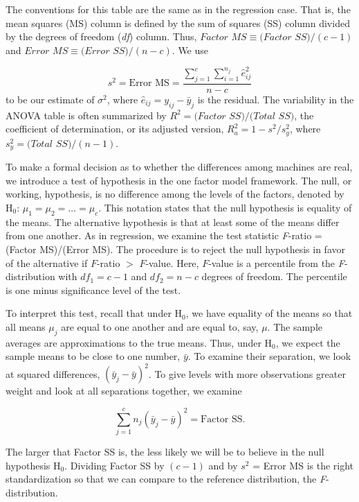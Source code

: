 The conventions for this table are the same as in the regression case. That
is, the mean squares (MS) column is defined by the sum of squares (SS)
column divided by the degrees of freedom (\textit{df}) column. Thus, $Factor$
$MS\equiv (Factor$ $SS)/(c-1)$ and $Error$ $MS\equiv (Error$ $SS)/(n-c)$. We
use

\begin{equation*}
s^{2}=\text{Error MS}=\frac{\sum_{j=1}^{c}\sum_{i=1}^{n_{j}}\hat{e}_{ij}^{2}%
}{n-c}
\end{equation*}%
to be our estimate of $\sigma ^{2}$, where $\hat{e}_{ij}=y_{ij}-\bar{y}_{j}$
is the residual. The variability in the ANOVA table is often summarized by $%
R^{2}=(Factor$ $SS)/(Total$ $SS)$, the coefficient of determination, or its
adjusted version, $R_a^{2}=1-s^{2}/s_{y}^{2}$, where $s_{y}^{2}=(Total$ $%
SS)/(n-1)$.


To make a formal decision as to whether the differences among
machines are real, we introduce a test of hypothesis in the one
factor model framework. The null, or working, hypothesis, is no
difference among the levels of the factors, denoted by H$_0$: $\mu
_1=\mu_2=\ldots =\mu_c$. This notation states that the null
hypothesis is equality of the means. The alternative hypothesis is
that at least some of the means differ from one another. As in
regression, we examine the test statistic \textit{F}-ratio = (Factor
MS)/(Error MS). The procedure is to reject the null hypothesis in
favor of the alternative if $F$-ratio $>$ $F$-value. Here, $F$-value
is a percentile from the \textit{F}-distribution with $df_1=c-1$ and
$df_2=n-c$ degrees of freedom. The percentile is one minus
significance level of the test.

To interpret this test, recall that under H$_0$, we have equality of
the means so that all means $\mu_{j}$ are equal to one another and
are equal to, say, $\mu $. The sample averages are approximations to
the true means.
Thus, under H$_0$, we expect the sample means to be close to one number, $%
\bar{y}$. To examine their separation, we look at squared differences, $(%
\bar{y}_{j}-\bar{y})^{2}$. To give levels with more observations greater
weight and look at all separations together, we examine

\begin{equation*}
\sum_{j=1}^{c}n_{j}(\bar{y}_{j}-\bar{y})^{2}=\text{Factor SS}.
\end{equation*}

The larger that Factor SS is, the less likely we will be to believe
in the null hypothesis H$_0$. Dividing Factor SS by $(c-1)$ and by
$s^{2}$ = Error MS is the right standardization so that we can
compare to the reference distribution, the \textit{F}-distribution.


